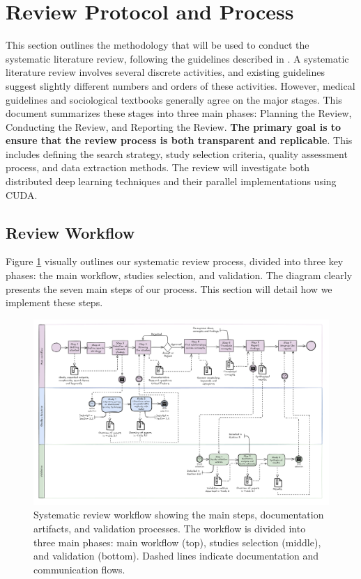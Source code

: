 \section{Review Protocol and Process}
\label{sec:protocol}

This section outlines the methodology that will be used to conduct the systematic literature review, following the guidelines described in \cite{brereton_lessons_2007-1,kitchenham_procedures_nodate,budgen_reporting_2018,dos_santos_sustainable_2024}.
A systematic literature review involves several discrete activities, and existing guidelines suggest slightly different numbers and orders of these activities.
However, medical guidelines and sociological textbooks generally agree on the major stages.
This document summarizes these stages into three main phases: Planning the Review, Conducting the Review, and Reporting the Review.
\textbf{The primary goal is to ensure that the review process is both transparent and replicable}.
This includes defining the search strategy, study selection criteria, quality assessment process,
and data extraction methods. The review will investigate both distributed deep learning techniques
and their parallel implementations using CUDA.

\subsection{Review Workflow}
Figure \ref{fig:workflow} visually outlines our systematic review process, divided into three key phases: the main workflow, studies selection, and validation. The diagram clearly presents the seven main steps of our process. This section will detail how we implement these steps.

\begin{figure}[th]
    \centering
    \includegraphics[width=\linewidth]{figures/workflow}
    \caption{Systematic review workflow showing the main steps, documentation artifacts, and validation processes.
    The workflow is divided into three main phases: main workflow (top), studies selection (middle), and
    validation (bottom). Dashed lines indicate documentation and communication flows.}
    \label{fig:workflow}
\end{figure}

